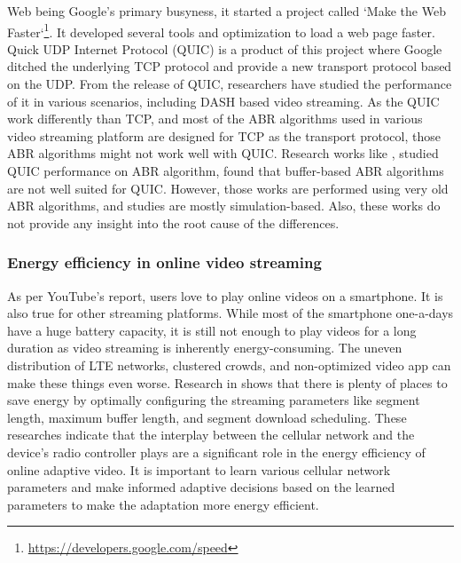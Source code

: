 Web being Google's primary busyness, it started a project called `Make the Web Faster`\footnote{\url{https://developers.google.com/speed}}. It developed several tools and optimization to load a web page faster. Quick UDP Internet Protocol (QUIC)\cite{langley2017quic} is a product of this project where Google ditched the underlying TCP protocol and provide a new transport protocol based on the UDP. From the release of QUIC, researchers have studied the performance of it in various scenarios, including DASH based video streaming. As the QUIC work differently than TCP, and most of the ABR algorithms used in various video streaming platform are designed for TCP as the transport protocol, those ABR algorithms might not work well with QUIC. Research works like \cite{bhat2018improving,van2018empirical}, studied QUIC performance on ABR algorithm, found that buffer-based ABR algorithms are not well suited for QUIC. However, those works are performed using very old ABR algorithms, and studies are mostly simulation-based. Also, these works do not provide any insight into the root cause of the differences.

\subsubsection{Energy efficiency in online video streaming}
As per YouTube's report, users love to play online videos on a smartphone. It is also true for other streaming platforms. While most of the smartphone one-a-days have a huge battery capacity, it is still not enough to play videos for a long duration as video streaming is inherently energy-consuming. The uneven distribution of LTE networks, clustered crowds, and non-optimized video app can make these things even worse. Research in \cite{10.1145/2910018.2910656} shows that there is plenty of places to save energy by optimally configuring the streaming parameters like segment length, maximum buffer length, and segment download scheduling. These researches indicate that the interplay between the cellular network and the device's radio controller plays are a significant role in the energy efficiency of online adaptive video. It is important to learn various cellular network parameters and make informed adaptive decisions based on the learned parameters to make the adaptation more energy efficient.

